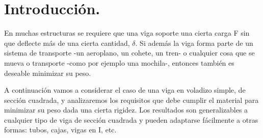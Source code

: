 \documentclass[15pt,a4paper]{article}
\begin{document}


\newpage
\tableofcontents

\begin{abstract}
    \underline{\textbf{Requerimiento del Trabajo:}} Analice, investigue e interprete el contenido relacionado con los Casos Prácticos de las fuentes de información que se indican a continuación a fin de adquirir y efectuar una explicación detallada de los mismos. [NOTA: Anualmente, la Cátedra asignará los Casos de Estudio a cada equipo de trabajo].
    
    \begin{itemize}
        \item Ashby, M.F. y Jones, D.R.H. Materiales para Ingeniería 1. 1ra Edición. 2009. Cap. 7 Casos prácticos de diseño limitado por el módulo (pp. 85-95), Cap. 12 Casos prácticos de diseño según el límite elástico (pp. 153-165), Cap. 15 Casos prácticos de fractura rápida (pp. 191-207), Cap 19 Casos prácticos de diseño a fatiga (pp. 251-270), Cap. 29 Casos prácticos de fricción y desgaste (pp. 395-390) y Cap. 30 Caso práctico final: materiales y energía en el diseño de coches (pp. 400-410) \{MM-CAD-0.0.0\}.
        \begin{itemize}
                \item 7.2 Caso práctico 2: selección de materiales para producir una viga de una rigidez dada con el mínimo peso. [Caso 2025].
        \end{itemize}
    \end{itemize}
\end{abstract}

\section{Introducción.}

En muchas estructuras se requiere que una viga soporte una cierta carga F sin que deflecte más de una cierta cantidad, $\delta$. Si además la viga forma parte de un sistema de transporte -un aeroplano, un cohete, un tren- o cualquier cosa que se mueva o transporte -como por ejemplo una mochila-, entonces también es deseable minimizar su peso.

A continuación vamos a considerar el caso de una viga en voladizo simple, de sección cuadrada, y analizaremos los requisitos que debe cumplir el material para minimizar su peso dada una cierta rigidez. Los resultados son generalizables a cualquier tipo de viga de sección cuadrada y pueden adaptarse fácilmente a otras formas: tubos, cajas, vigas en I, etc.
\end{document}
